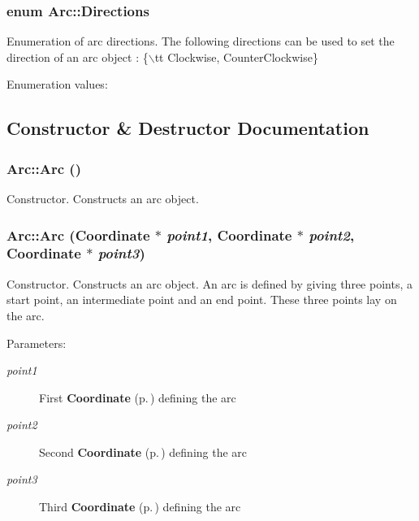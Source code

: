 \subsubsection{\setlength{\rightskip}{0pt plus 5cm}enum Arc::Directions}\label{classArc_s4}


Enumeration of arc directions. The following directions can be used to set the direction of an arc object : \{$\backslash$tt Clockwise, Counter\-Clockwise\} \begin{Desc}
\item[Enumeration values: ]\par
\begin{description}
\item[{\em 
{\em Clockwise}\label{classArc_s4s0}
}]\item[{\em 
{\em Counter\-Clockwise}\label{classArc_s4s1}
}]\end{description}
\end{Desc}



\subsection{Constructor \& Destructor Documentation}
\subsubsection{\setlength{\rightskip}{0pt plus 5cm}Arc::Arc ()}\label{classArc_a0}


Constructor. Constructs an arc object. 
\subsubsection{\setlength{\rightskip}{0pt plus 5cm}Arc::Arc ({\bf Coordinate} $\ast$ {\em point1}, {\bf Coordinate} $\ast$ {\em point2}, {\bf Coordinate} $\ast$ {\em point3})}\label{classArc_a1}


Constructor. Constructs an arc object. An arc is defined by giving three points, a start point, an intermediate point and an end point. These three points lay on the arc. \begin{Desc}
\item[Parameters: ]\par
\begin{description}
\item[{\em 
point1}]First {\bf Coordinate} {\rm (p.\,\pageref{classCoordinate})} defining the arc \item[{\em 
point2}]Second {\bf Coordinate} {\rm (p.\,\pageref{classCoordinate})} defining the arc \item[{\em 
point3}]Third {\bf Coordinate} {\rm (p.\,\pageref{classCoordinate})} defining the arc \end{description}
\end{Desc}
